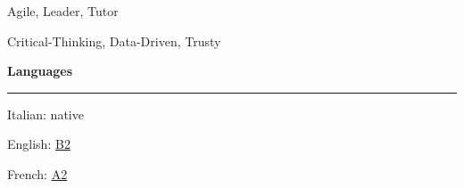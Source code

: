 \documentclass[11pt,letterpaper]{article}
\begin{document}
\begin{justify}
\begin{minipage}[t]{6.6cm}
\begin{itemize}[label={}, leftmargin=0pt]
                  \begin{item}
                        Agile, Leader, Tutor
                  \end{item}
                  \begin{item}
                        Critical-Thinking, Data-Driven, Trusty
                  \end{item}
            \end{itemize}
      \end{minipage}
      \hfill
      \begin{minipage}[t]{2.5cm}
            \textbf{Languages}\strut
            \hrule
            \vspace{0.2cm}
            \begin{itemize}[label={}, leftmargin=0pt]
                  \begin{item}
                        Italian: native
                  \end{item}
                  \begin{item}
                        English:
                        \href{https://dariocurr.github.io/assets/doc/B2_english.pdf}{B2}
                  \end{item}
                  \begin{item}
                        French:
                        \href{https://dariocurr.github.io/assets/doc/A2_french.pdf}{A2}
                  \end{item}
            \end{itemize}
      \end{minipage}
\end{justify}
\end{document}
